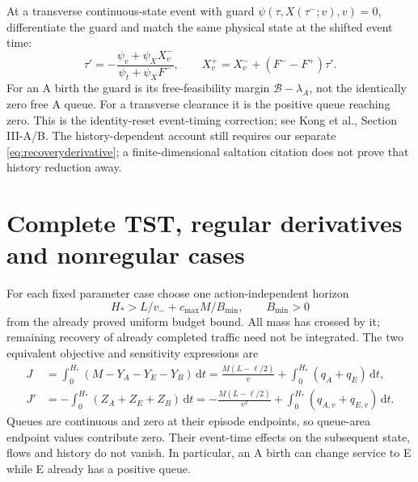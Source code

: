 \documentclass[11pt,a4paper]{article}
\newcommand{\dd}{\,\mathrm d}
\newcommand{\Bud}{\mathcal B}
\begin{document}
At a transverse continuous-state event with guard
$\psi(\tau,X(\tau^-;v),v)=0$, differentiate the guard and match the same
physical state at the shifted event time:
\begin{equation}
 \tau'=-\frac{\psi_v+\psi_X X_v^-}{\psi_t+\psi_X F^-},\qquad
 X_v^+=X_v^-+(F^- -F^+)\tau'.
 \label{eq:eventderivative}
\end{equation}
For an A birth the guard is its free-feasibility margin
$\Bud-\lambda_A$, not the identically zero free A queue. For a transverse
clearance it is the positive queue reaching zero. This is the
identity-reset event-timing correction; see Kong et al., Section III-A/B.
The history-dependent account still requires our separate
\eqref{eq:recoveryderivative}; a finite-dimensional saltation citation
does not prove that history reduction away.

\section{Complete TST, regular derivatives and nonregular cases}
For each fixed parameter case choose one action-independent horizon
\begin{equation}
 H_*>L/v_-+c_{\max}M/B_{\min},\qquad B_{\min}>0
 \label{eq:horizon}
\end{equation}
from the already proved uniform budget bound. All mass has crossed by it;
remaining recovery of already completed traffic need not be integrated.
The two equivalent objective and sensitivity expressions are
\begin{align}
 J&=\int_0^{H_*}(M-Y_A-Y_E-Y_B)\dd t
   =\frac{M(L-\ell/2)}v+\int_0^{H_*}(q_A+q_E)\dd t,\nonumber\\
 J'&=-\int_0^{H_*}(Z_A+Z_E+Z_B)\dd t
   =-\frac{M(L-\ell/2)}{v^2}
        +\int_0^{H_*}(q_{A,v}+q_{E,v})\dd t.
 \label{eq:tstderivative}
\end{align}
Queues are continuous and zero at their episode endpoints, so queue-area
endpoint values contribute zero. Their event-time effects on the subsequent
state, flows and history do not vanish. In particular, an A birth can
change service to E while E already has a positive queue.
\end{document}

